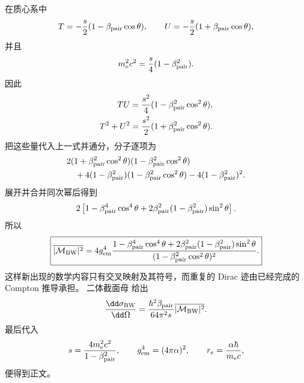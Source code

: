 \begin{derivation}[双光子产生电子对的角分布]
在质心系中
\begin{equation*}
 T=-\frac s2(1-\beta_{\rm pair}\cos\theta),
 \qquad
 U=-\frac s2(1+\beta_{\rm pair}\cos\theta),
\end{equation*}
并且
\begin{equation*}
 m_{\mathrm e}^2c^2=\frac s4(1-\beta_{\rm pair}^2).
\end{equation*}
因此
\begin{align*}
 TU
 &=\frac{s^2}{4}(1-\beta_{\rm pair}^2\cos^2\theta),\\
 T^2+U^2
 &=\frac{s^2}{2}(1+\beta_{\rm pair}^2\cos^2\theta).
\end{align*}
把这些量代入上一式并通分，分子逐项为
\begin{align*}
 &2(1+\beta_{\rm pair}^2\cos^2\theta)
 (1-\beta_{\rm pair}^2\cos^2\theta)\\
 &\quad+4(1-\beta_{\rm pair}^2)
 (1-\beta_{\rm pair}^2\cos^2\theta)
 -4(1-\beta_{\rm pair}^2)^2.
\end{align*}
展开并合并同次幂后得到
\begin{equation*}
 2\left[
 1-\beta_{\rm pair}^4\cos^4\theta
 +2\beta_{\rm pair}^2(1-\beta_{\rm pair}^2)\sin^2\theta
 \right].
\end{equation*}
所以
\begin{equation*}
 \boxed{
 \overline{|\mathcal M_{\rm BW}|^2}
 =4g_{\rm em}^4
 \frac{
 1-\beta_{\rm pair}^4\cos^4\theta
 +2\beta_{\rm pair}^2(1-\beta_{\rm pair}^2)\sin^2\theta
 }{(1-\beta_{\rm pair}^2\cos^2\theta)^2}.}
\end{equation*}
这样新出现的数学内容只有交叉映射及其符号，而重复的 Dirac 迹由已经完成的 Compton 推导承担。
二体截面母 给出
\begin{equation*}
 \frac{\dd\sigma_{\rm BW}}{\dd\Omega}
 =\frac{\hbar^2\beta_{\rm pair}}{64\pi^2s}
 \overline{|\mathcal M_{\rm BW}|^2}.
\end{equation*}
最后代入
\begin{equation*}
 s=\frac{4m_{\mathrm e}^2c^2}{1-\beta_{\rm pair}^2},\qquad
 g_{\rm em}^4=(4\pi\alpha)^2,\qquad
 r_e=\frac{\alpha\hbar}{m_{\mathrm e} c},
\end{equation*}
便得到正文。
\end{derivation}

